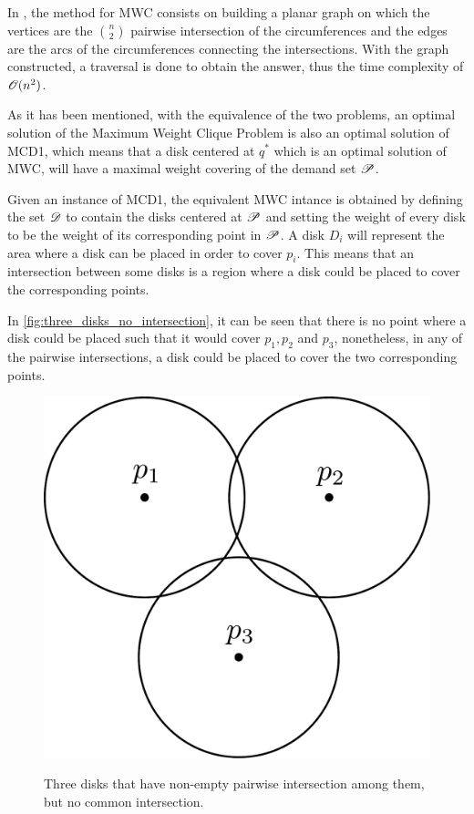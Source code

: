 In , the method for MWC consists on building a planar graph on which the vertices are the $\binom{n}{2}$ pairwise intersection of the circumferences and the edges are the arcs of the circumferences connecting the intersections. With the graph constructed, a traversal is done to obtain the answer, thus the time complexity of $\mathscr{O}(n^2)$.

As it has been mentioned, with the equivalence of the two problems, an optimal solution of the Maximum Weight Clique Problem is also an optimal solution of MCD1, which means that a disk centered at $q^*$ which is an optimal solution of MWC, will have a maximal weight covering of the demand set $\mathscr{P}$.

Given an instance of MCD1, the equivalent MWC intance is obtained by defining the set $\mathscr{D}$ to contain the disks centered at $\mathscr{P}$ and setting the weight of every disk to be the weight of its corresponding point in $\mathscr{P}$. A disk $D_i$ will represent the area where a disk can be placed in order to cover $p_i$. This means that an intersection between some disks is a region where a disk could be placed to cover the corresponding points.

In \autoref{fig:three_disks_no_intersection}, it can be seen that there is no point where a disk could be placed such that it would cover $p_1, p_2$ and $p_3$, nonetheless, in any of the pairwise intersections, a disk could be placed to cover the two corresponding points.

\begin{figure}[h]
	\centering
	
	\caption{Three disks that have non-empty pairwise intersection among them, but no common intersection.}
	
	\includegraphics[scale=.25]{tex/figures/three_disks_no_intersection.pdf}
	\label{fig:three_disks_no_intersection}
	\fautor
\end{figure}


